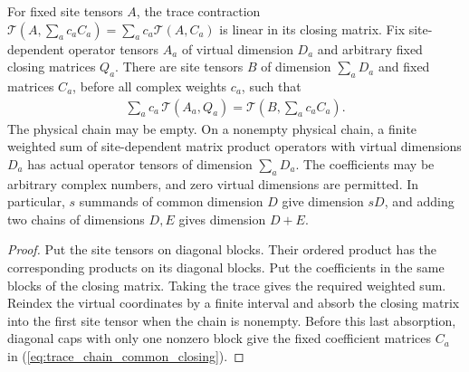 \begin{lemma}
    \label{lem:trace_chain_linear_combination}
    \leanok

    For fixed site tensors $A$, the trace contraction
    $\mathcal T(A,\sum_a c_aC_a)=\sum_a c_a\mathcal T(A,C_a)$
    is linear in its closing matrix. Fix site-dependent operator tensors $A_a$ of virtual dimension $D_a$
    and arbitrary fixed closing matrices $Q_a$. There are site tensors $B$
    of dimension $\sum_aD_a$ and fixed matrices $C_a$, before all complex
    weights $c_a$, such that
    \begin{align}
        \sum_a c_a\,\mathcal T(A_a,Q_a)
        =\mathcal T\!\left(B,\sum_a c_aC_a\right).
        \label{eq:trace_chain_common_closing}
    \end{align}
    The physical chain may be empty. On a nonempty physical chain, a finite weighted sum of
    site-dependent matrix product operators with virtual dimensions
    $D_a$ has actual operator tensors of dimension $\sum_aD_a$.
    The coefficients may be arbitrary complex numbers, and zero
    virtual dimensions are permitted. In particular, $s$ summands
    of common dimension $D$ give dimension $sD$, and adding two
    chains of dimensions $D,E$ gives dimension $D+E$.
\end{lemma}
\begin{proof}\leanok
    Put the site tensors on diagonal blocks. Their ordered product
    has the corresponding products on its diagonal blocks. Put the
    coefficients in the same blocks of the closing matrix. Taking
    the trace gives the required weighted sum. Reindex the virtual
    coordinates by a finite interval and absorb the closing matrix
    into the first site tensor when the chain is nonempty. Before this
    last absorption, diagonal caps with only one nonzero block give the
    fixed coefficient matrices $C_a$ in
    (\ref{eq:trace_chain_common_closing}).
\end{proof}


